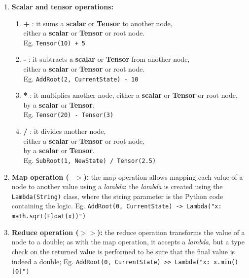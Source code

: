 \documentclass[12pt,a4paper,openright,twoside]{book}
\begin{document}
\begin{enumerate}
    \item \textbf{Scalar and tensor operations:}
          \begin{enumerate}
              \item \textbf{+} : 
                    it sums a \textbf{scalar} or \textbf{Tensor} to another node, \\
                    either a \textbf{scalar} or \textbf{Tensor} or root node. \\
                    Eg. \lstinline|Tensor(10) + 5|
              \item \textbf{-} : 
                    it subtracts a \textbf{scalar} or \textbf{Tensor} from another node, \\
                    either a \textbf{scalar} or \textbf{Tensor} or root node. \\
                    Eg. \lstinline|AddRoot(2, CurrentState) - 10|
              \item \textbf{*} : 
                    it multiplies another node, 
                    either a \textbf{scalar} or \textbf{Tensor} or root node, \\
                    by a \textbf{scalar} or \textbf{Tensor}. \\
                    Eg. \lstinline|Tensor(20) - Tensor(3)|
              \item \textbf{/} : 
                    it divides another node, \\
                    either a \textbf{scalar} or \textbf{Tensor} or root node, \\
                    by a \textbf{scalar} or \textbf{Tensor}. \\
                    Eg. \lstinline|SubRoot(1, NewState) / Tensor(2.5)|
          \end{enumerate}
          
    \item \textbf{Map operation ($->$):} 
          the map operation allows mapping each value of a node to another value using a \emph{lambda}; 
          the \emph{lambda} is created using the \lstinline|Lambda(String)| class, 
          where the string parameter is the Python code containing the logic. 
          Eg. \lstinline|AddRoot(0, CurrentState) -> Lambda("x: math.sqrt(Float(x))")|
          
    \item \textbf{Reduce operation ($>>$):} 
          the reduce operation transforms the value of a node to a double; 
          as with the map operation, it accepts a \emph{lambda}, 
          but a type check on the returned value is performed to be sure 
          that the final value is indeed a double; 
          Eg. \lstinline|AddRoot(0, CurrentState) >> Lambda("x: x.min()[0]")|
\end{enumerate}
\end{document}
